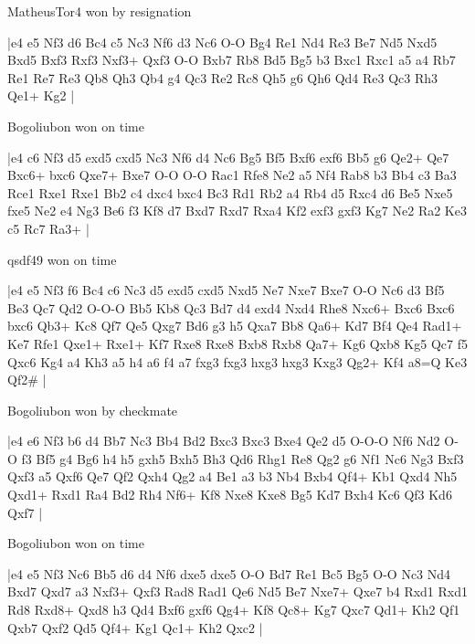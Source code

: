 \showboard

MatheusTor4 won by resignation

\makegametitle
|e4 e5 Nf3 d6 Bc4 c5 Nc3 Nf6 d3 Nc6 O-O Bg4 Re1 Nd4 Re3 Be7 Nd5 Nxd5 Bxd5 Bxf3 Rxf3 Nxf3+ Qxf3 O-O Bxb7 Rb8 Bd5 Bg5 b3 Bxc1 Rxc1 a5 a4 Rb7 Re1 Re7 Re3 Qb8 Qh3 Qb4 g4 Qc3 Re2 Rc8 Qh5 g6 Qh6 Qd4 Re3 Qc3 Rh3 Qe1+ Kg2  |

\showboard

Bogoliubon won on time

\makegametitle
|e4 c6 Nf3 d5 exd5 cxd5 Nc3 Nf6 d4 Nc6 Bg5 Bf5 Bxf6 exf6 Bb5 g6 Qe2+ Qe7 Bxc6+ bxc6 Qxe7+ Bxe7 O-O O-O Rac1 Rfe8 Ne2 a5 Nf4 Rab8 b3 Bb4 c3 Ba3 Rce1 Rxe1 Rxe1 Bb2 c4 dxc4 bxc4 Bc3 Rd1 Rb2 a4 Rb4 d5 Rxc4 d6 Be5 Nxe5 fxe5 Ne2 e4 Ng3 Be6 f3 Kf8 d7 Bxd7 Rxd7 Rxa4 Kf2 exf3 gxf3 Kg7 Ne2 Ra2 Ke3 c5 Rc7 Ra3+  |

\showboard

qsdf49 won on time

\makegametitle
|e4 e5 Nf3 f6 Bc4 c6 Nc3 d5 exd5 cxd5 Nxd5 Ne7 Nxe7 Bxe7 O-O Nc6 d3 Bf5 Be3 Qc7 Qd2 O-O-O Bb5 Kb8 Qc3 Bd7 d4 exd4 Nxd4 Rhe8 Nxc6+ Bxc6 Bxc6 bxc6 Qb3+ Kc8 Qf7 Qe5 Qxg7 Bd6 g3 h5 Qxa7 Bb8 Qa6+ Kd7 Bf4 Qe4 Rad1+ Ke7 Rfe1 Qxe1+ Rxe1+ Kf7 Rxe8 Rxe8 Bxb8 Rxb8 Qa7+ Kg6 Qxb8 Kg5 Qc7 f5 Qxc6 Kg4 a4 Kh3 a5 h4 a6 f4 a7 fxg3 fxg3 hxg3 hxg3 Kxg3 Qg2+ Kf4 a8=Q Ke3 Qf2\#  |

\showboard

Bogoliubon won by checkmate

\makegametitle
|e4 e6 Nf3 b6 d4 Bb7 Nc3 Bb4 Bd2 Bxc3 Bxc3 Bxe4 Qe2 d5 O-O-O Nf6 Nd2 O-O f3 Bf5 g4 Bg6 h4 h5 gxh5 Bxh5 Bh3 Qd6 Rhg1 Re8 Qg2 g6 Nf1 Nc6 Ng3 Bxf3 Qxf3 a5 Qxf6 Qe7 Qf2 Qxh4 Qg2 a4 Be1 a3 b3 Nb4 Bxb4 Qf4+ Kb1 Qxd4 Nh5 Qxd1+ Rxd1 Ra4 Bd2 Rh4 Nf6+ Kf8 Nxe8 Kxe8 Bg5 Kd7 Bxh4 Kc6 Qf3 Kd6 Qxf7  |

\showboard

Bogoliubon won on time

\makegametitle
|e4 e5 Nf3 Nc6 Bb5 d6 d4 Nf6 dxe5 dxe5 O-O Bd7 Re1 Bc5 Bg5 O-O Nc3 Nd4 Bxd7 Qxd7 a3 Nxf3+ Qxf3 Rad8 Rad1 Qe6 Nd5 Be7 Nxe7+ Qxe7 b4 Rxd1 Rxd1 Rd8 Rxd8+ Qxd8 h3 Qd4 Bxf6 gxf6 Qg4+ Kf8 Qc8+ Kg7 Qxc7 Qd1+ Kh2 Qf1 Qxb7 Qxf2 Qd5 Qf4+ Kg1 Qc1+ Kh2 Qxc2  |

